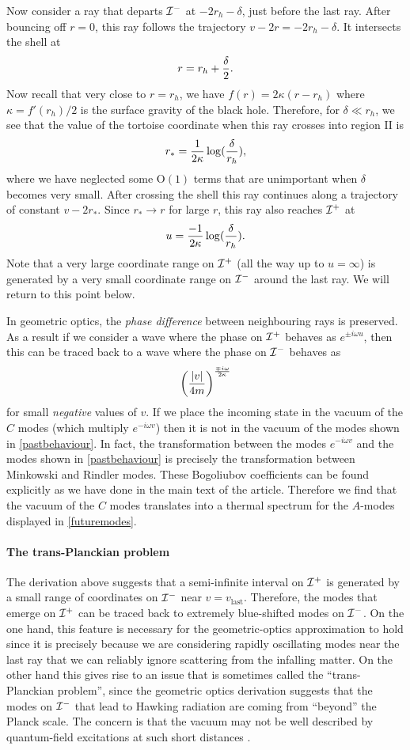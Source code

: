 \documentclass[12pt]{article}
\def\Or[#1]{{\text{O}}\left({#1}\right)}
\def\rtor{{r_*}}
\newcommand{\be}{\begin{equation}}
\newcommand{\ee}{\end{equation}}
\def \scrip{{\cal I}^{+}}
\def \scrim{{\cal I}^{-}}
\begin{document}
Now consider a ray that departs $\scrim$ at $-2 r_h - \delta$, just before the last ray. After bouncing off $r = 0$, this ray follows the trajectory $v - 2 r = -2 r_h - \delta$. It intersects the shell at 
\be
r = r_h + {\delta \over 2}.
\ee
Now recall that very close to $r = r_h$, we have $f(r) = 2 \kappa (r - r_h)$ where $\kappa = f'(r_h)/2$ is the surface gravity of the black hole. Therefore, for $\delta \ll r_h$, we see that the value of the tortoise coordinate when this ray crosses into region II is 
\be
\rtor = {1 \over 2 \kappa} \log({\delta \over r_h}),
\ee
where we have neglected some $\Or[1]$ terms that are unimportant when $\delta$ becomes very small. After crossing the shell this ray continues along a trajectory of constant $v - 2 \rtor$. Since $\rtor \rightarrow r$ for large $r$, this ray also reaches $\scrip$ at 
\be
u = {-1 \over 2 \kappa} \log({\delta \over r_h}).
\ee
Note that a very large coordinate range on ${\cal I}^+$ (all the way up to $u = \infty$) is generated by a very small coordinate range on ${\cal I}^{-}$ around the last ray. We will return to this point below.

In geometric optics, the {\em phase difference} between neighbouring rays is preserved. As a result if we consider a wave where the phase on ${\cal I}^+$ behaves as $e^{\pm i \omega u}$, then this can be traced back to a wave where the phase on ${\cal I}^{-}$ behaves as 
\be
\label{pastbehaviour}
\left({|v| \over  4 m}\right)^{\mp  i \omega \over 2 \kappa}
\ee
 for small {\em negative} values of  $v$. If we place the incoming state in the vacuum of the $C$ modes (which multiply $e^{-i \omega v}$) then it is not in the vacuum of the modes shown in \eqref{pastbehaviour}. In fact, the transformation between the modes $e^{-i \omega v}$ and the modes shown in \eqref{pastbehaviour} is precisely the transformation between Minkowski and Rindler modes. These Bogoliubov coefficients can be found explicitly as we have done in the main text of the article. Therefore we find that the vacuum of the $C$ modes translates into a thermal spectrum for the $A$-modes displayed in \eqref{futuremodes}. 

\paragraph{\bf The trans-Planckian problem \\}
The derivation above suggests that a semi-infinite interval on $\scrip$ is generated by a small range of coordinates on $\scrim$ near $v = v_{\text{last}}$. Therefore, the modes that emerge on $\scrip$ can be traced back to extremely blue-shifted modes on $\scrim$.  On the one hand, this feature is necessary for the geometric-optics approximation to hold since it is precisely because we are considering rapidly oscillating modes near the last ray that we can reliably ignore
scattering from the infalling matter. On the other hand this gives rise to an issue that is sometimes called the ``trans-Planckian problem'', since the geometric optics derivation suggests that the modes on $\scrim$ that lead to Hawking radiation are coming from ``beyond'' the Planck scale. The concern is that the vacuum may not be well described by quantum-field excitations at such short distances \cite{tHooft:1996rdg}.
\end{document}
